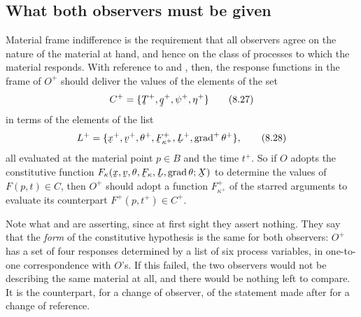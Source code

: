 \subsection*{What both observers must be given}

Material frame indifference is the requirement that all observers agree
on the nature of the material at hand, and hence on the class of
processes to which the material responds. With reference to 
and , then, the response functions in the frame of $O^{+}$
should deliver the values of the elements of the set
\begin{equation}
   C^{+}=\{\bT^{+},\bq^{+},\psi^{+},\eta^{+}\}
   \tag{8.27}\label{eq:8.27}
\end{equation}
in terms of the elements of the list
\begin{equation}
   L^{+}=\{\bx^{+},\bv^{+},\theta^{+},\bF^{+}_{\kappa^{+}},\bL^{+},
   \grad^{+}\theta^{+}\},
   \tag{8.28}\label{eq:8.28}
\end{equation}
all evaluated at the material point $p\in B$ and the time $t^{+}$. So if
$O$ adopts the constitutive function
$F_{\kappa}(\bx,\bv,\theta,\bF_{\kappa},\bL,\grad\theta;\bX)$ to
determine the values of $F(p,t)\in C$, then $O^{+}$ should adopt a
function $F^{+}_{\kappa^{+}}$ of the starred arguments to evaluate its
counterpart $F^{+}(p,t^{+})\in C^{+}$.

Note what  and  are asserting, since at first sight
they assert nothing. They say that the \emph{form} of the constitutive
hypothesis is the same for both observers: $O^{+}$ has a set of four
responses determined by a list of six process variables, in one-to-one
correspondence with $O$'s. If this failed, the two observers would not be
describing the same material at all, and there would be nothing left to
compare. It is the counterpart, for a change of observer, of the
statement made after  for a change of reference.

